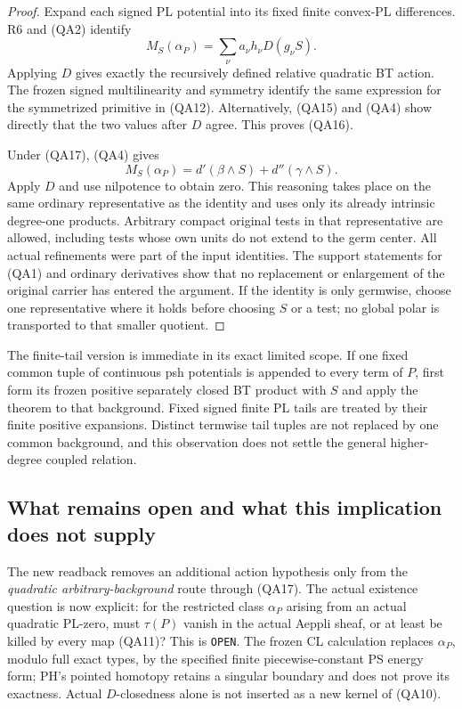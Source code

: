\begin{proof}
Expand each signed PL potential into its fixed finite convex-PL
differences.  R6 and (QA2) identify
\[
          M_S(\alpha_P)=\sum_\nu a_\nu h_\nu D(g_\nu S).
                                                        \tag{QA18}
\]
Applying $D$ gives exactly the recursively defined relative
quadratic BT action.  The frozen signed multilinearity and symmetry
identify the same expression for the symmetrized primitive in
(QA12).  Alternatively, (QA15) and (QA4) show directly that the
two values after $D$ agree.  This proves (QA16).

Under (QA17), (QA4) gives
\[
 M_S(\alpha_P)=d'(\beta\wedge S)+d''(\gamma\wedge S).
                                                        \tag{QA19}
\]
Apply $D$ and use nilpotence to obtain zero.  This reasoning takes
place on the same ordinary representative as the identity and
uses only its already intrinsic degree-one products.  Arbitrary
compact original tests in that representative are allowed, including
tests whose own units do not extend to the germ center.
All actual refinements were part of the input identities.
The support statements for (QA1) and ordinary derivatives show
that no replacement or enlargement of the original carrier has
entered the argument.  If the identity is only germwise, choose
one representative where it holds before choosing $S$ or a test;
no global polar is transported to that smaller quotient.
\end{proof}

The finite-tail version is immediate in its exact limited scope.
If one fixed common tuple of continuous psh potentials is appended
to every term of $P$, first form its frozen positive separately
closed BT product with $S$ and apply the theorem to that background.
Fixed signed finite PL tails are treated by their finite positive
expansions.  Distinct termwise tail tuples are not replaced by one
common background, and this observation does not settle the general
higher-degree coupled relation.

\subsection{What remains open and what this implication does not supply}

The new readback removes an additional action hypothesis only from
the \emph{quadratic arbitrary-background} route through (QA17).
The actual existence question is now explicit: for the restricted
class $\alpha_P$ arising from an actual quadratic PL-zero, must
$\tau(P)$ vanish in the actual Aeppli sheaf, or at least be killed
by every map (QA11)?  This is \texttt{OPEN}.  The frozen CL
calculation replaces $\alpha_P$, modulo full exact types, by the
specified finite piecewise-constant PS energy form; PH's pointed
homotopy retains a singular boundary and does not prove its
exactness.  Actual $D$-closedness alone is not inserted as a new
kernel of (QA10).

